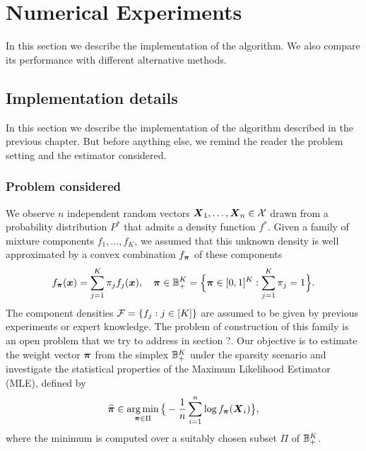 
\chapter{Numerical Experiments}

In this section we describe the implementation of the algorithm. We also compare its performance with different alternative methods.

\section{Implementation details}

In this section we describe the implementation of the algorithm described in the previous chapter. But before anything else, we remind the reader the problem setting and the estimator considered. 
\subsection{Problem considered}
We observe $n$ independent random vectors $\boldsymbol X_1,\ldots,\boldsymbol X_n\in\mathcal X$ drawn from a probability distribution $P^*$ that admits a density function $f^*$. Given a family of mixture components $f_1,\ldots,f_K$, we assumed that this unknown density is well approximated by a convex combination $f_{\boldsymbol \pi}$ of these components
\begin{equation}
f_{\boldsymbol \pi}(\boldsymbol x)=\sum_{j=1}^K\pi_j f_j(\boldsymbol x), \quad \boldsymbol \pi \in {\mathbb B}_+^K=\Big\{\boldsymbol \pi\in [0,1]^K: \sum_{j=1}^K\pi_j=1\Big\}.
\end{equation}
The component densities $\mathcal F=\{f_j:j\in[K]\}$ are assumed to be given by previous experiments or expert knowledge. The problem of construction of this family is an open problem that we try to address in section ?. Our objective is to estimate the weight vector $\boldsymbol \pi$ from the simplex ${\mathbb B}_+^K$ under the sparsity scenario and investigate the statistical properties of the Maximum Likelihood Estimator (MLE), defined by
\begin{equation}
\label{MLE_2}
\widehat{\boldsymbol \pi} \in \operatorname*{arg\,min}_{\boldsymbol \pi\in \Pi}\big\{-\frac{1}{n}\sum_{i=1}^n\log f_{\boldsymbol \pi}(\boldsymbol X_i)\big\},
\end{equation}
where the minimum is computed over a suitably chosen subset $\Pi$ of ${\mathbb B}_+^K$. 
